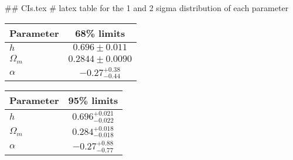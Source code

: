 ## CIs.tex
# latex table for the 1 and 2 sigma distribution of each parameter

\begin{tabular} { l  c}
 Parameter &  68\% limits\\
\hline
{\boldmath$h              $} & $0.696\pm 0.011            $\\
{\boldmath$\Omega_m       $} & $0.2844\pm 0.0090          $\\
{\boldmath$\alpha         $} & $-0.27^{+0.38}_{-0.44}     $\\
\hline
\end{tabular}

\begin{tabular} { l  c}
 Parameter &  95\% limits\\
\hline
{\boldmath$h              $} & $0.696^{+0.021}_{-0.022}   $\\
{\boldmath$\Omega_m       $} & $0.284^{+0.018}_{-0.018}   $\\
{\boldmath$\alpha         $} & $-0.27^{+0.88}_{-0.77}     $\\
\hline
\end{tabular}
